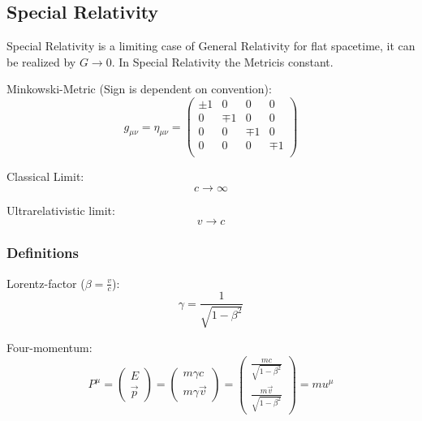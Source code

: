 	\subsection{Special Relativity}
		\noindent
		Special Relativity is a limiting case of General Relativity for flat spacetime, it can be realized by $G \rightarrow 0$. In Special Relativity the Metricis constant.%

		\noindent
		Minkowski-Metric (Sign is dependent on convention):
		\begin{equation}
			g_{\mu\nu} = \eta_{\mu\nu}
			= \left( \begin{matrix}
				\pm1 & 0		& 0		& 0		\\
				0		& \mp1 & 0		& 0		\\
				0		& 0		& \mp1 & 0		\\
				0		& 0		& 0		& \mp1 \\
			\end{matrix} \right)
		\end{equation}

		\noindent
		Classical Limit:
		\begin{equation}
			c \rightarrow \infty
		\end{equation}

		\noindent
		Ultrarelativistic limit:
		\begin{equation}
			v\rightarrow c
		\end{equation}

		\subsubsection{Definitions}
			\noindent
			Lorentz-factor ($\beta = \frac{v}{c}$):
			\begin{equation}
				\gamma = \frac{1}{\sqrt{1-\beta^2}}
			\end{equation}

			\noindent
			Four-momentum:
			\begin{equation}
				P^\mu =
				\left(\begin{matrix}
					E \\ \vec{p}
				\end{matrix}\right)
				= \left(\begin{matrix}
					m\gamma c \\ m\gamma\vec{v}
				\end{matrix}\right)
				= \left(\begin{matrix}
					\frac{mc}{\sqrt{1-\beta^2}} \\ \frac{m\vec{v}}{\sqrt{1-\beta^2}}
				\end{matrix}\right)
				= m u^\mu
			\end{equation}

